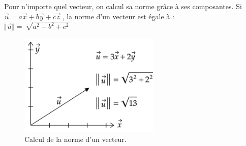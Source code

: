 \documentclass[
	11pt, %
	fleqn, %
	a4paper, %
]{LegrandOrangeBook}
\begin{document}
Pour n'importe quel vecteur, on calcul sa norme grâce à ses composantes. Si $ \overrightarrow{u} = a \vec{x} + b \vec{y} + c \vec{z} \ $, la norme d'un vecteur est égale à :\\
$\Vert \overrightarrow{u}\Vert =\ \sqrt{a^2 + b^2 + c^2} $

\begin{figure}[H] %
	\centering %
	\includegraphics[width=0.6\textwidth]{Images/norme3.png} %
	\caption{Calcul de la norme d'un vecteur.}
	\label{norme3} %
\end{figure}
\end{document}
